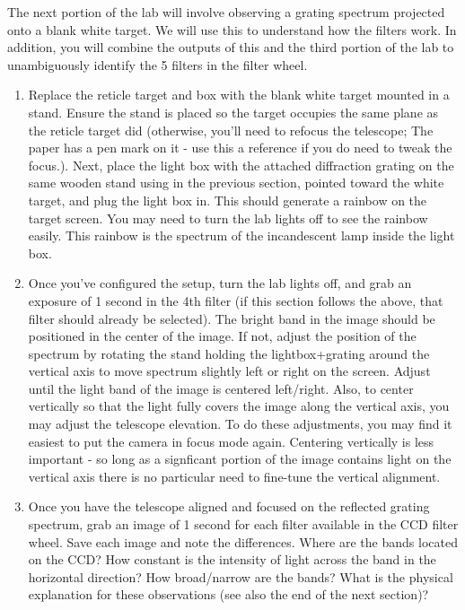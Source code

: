 The next portion of the lab will involve observing a grating spectrum projected onto a blank white
target. We will use this to understand how the filters work. In addition, you will combine the
outputs of this and the third portion of the lab to unambiguously identify the 5 filters in the filter
wheel.
\begin{enumerate}
	\item Replace the reticle target and box with the blank white target mounted in a stand. Ensure
	the stand is placed so the target occupies the same plane as the reticle target did (otherwise,
	you’ll need to refocus the telescope; The paper has a pen mark on it - use this a reference if you do need to tweak the focus.). Next, place the light box with the attached diffraction
	grating on the same wooden stand using in the previous section, pointed toward the white target, and plug the light box in.
	This should generate a rainbow on the target screen. You may need to turn the lab lights
	off to see the rainbow easily. This rainbow is the spectrum of the incandescent lamp inside
	the light box.
	
	\item Once you’ve configured the setup, turn the lab lights off, and grab an exposure of 1 second
	in the 4th filter (if this section follows the above, that filter should already be selected).
	The bright band in the image should be positioned in the center of the image. If not, adjust
	the position of the spectrum by rotating the stand holding the lightbox+grating around the
	vertical axis to move spectrum slightly left or right on the screen. Adjust until the light band of the image is centered left/right. Also,
	to center vertically so that the light fully covers the image along the vertical axis, you may
 adjust the telescope elevation. To do these adjustments, you may find it easiest to put the camera
	in focus mode again. Centering vertically is less important - so long as a signficant portion
	of the image contains light on the vertical axis there is no particular need to fine-tune the
	vertical alignment.
	
	\item Once you have the telescope aligned and focused on the reflected grating spectrum, grab an
	image of 1 second for each filter available in the CCD filter wheel. Save each image and note
	the differences. Where are the bands located on the CCD? How constant is the intensity of
	light across the band in the horizontal direction? How broad/narrow are the bands? What
	is the physical explanation for these observations (see also the end of the next section)?
\end{enumerate}

